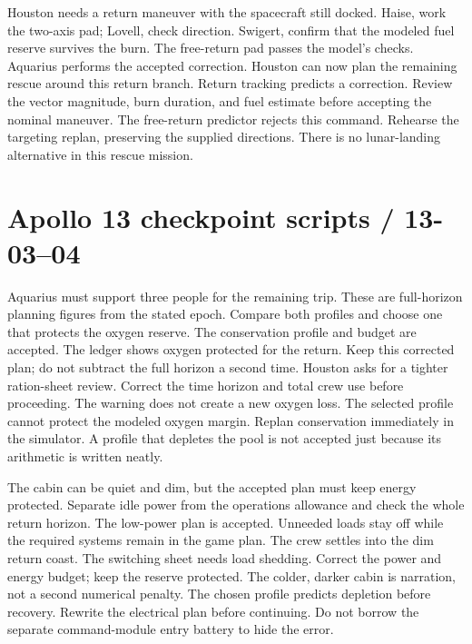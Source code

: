 {Houston needs a return maneuver with the spacecraft still docked.
Haise, work the two-axis pad; Lovell, check direction.
Swigert, confirm that the modeled fuel reserve survives the burn.}
{The free-return pad passes the model's checks.
Aquarius performs the accepted correction.
Houston can now plan the remaining rescue around this return branch.}
{Return tracking predicts a correction.
Review the vector magnitude, burn duration, and fuel estimate
before accepting the nominal maneuver.}
{The free-return predictor rejects this command.
Rehearse the targeting replan, preserving the supplied directions.
There is no lunar-landing alternative in this rescue mission.}

\clearpage
\section*{Apollo 13 checkpoint scripts / 13-03--04}
{Aquarius must support three people for the remaining trip.
These are full-horizon planning figures from the stated epoch.
Compare both profiles and choose one that protects the oxygen reserve.}
{The conservation profile and budget are accepted.
The ledger shows oxygen protected for the return.
Keep this corrected plan; do not subtract the full horizon a second time.}
{Houston asks for a tighter ration-sheet review.
Correct the time horizon and total crew use before proceeding.
The warning does not create a new oxygen loss.}
{The selected profile cannot protect the modeled oxygen margin.
Replan conservation immediately in the simulator.
A profile that depletes the pool is not accepted just because
its arithmetic is written neatly.}

{The cabin can be quiet and dim, but the accepted plan must keep
energy protected. Separate idle power from the operations allowance
and check the whole return horizon.}
{The low-power plan is accepted.
Unneeded loads stay off while the required systems remain in
the game plan. The crew settles into the dim return coast.}
{The switching sheet needs load shedding.
Correct the power and energy budget; keep the reserve protected.
The colder, darker cabin is narration, not a second numerical penalty.}
{The chosen profile predicts depletion before recovery.
Rewrite the electrical plan before continuing.
Do not borrow the separate command-module entry battery to hide the error.}

\clearpage
